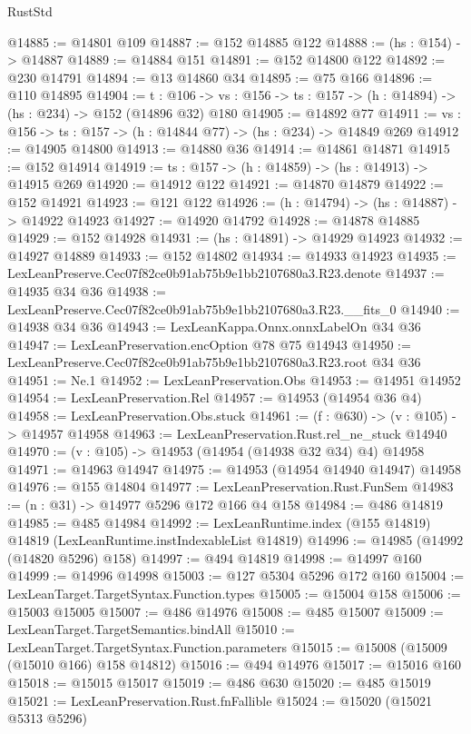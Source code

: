 \begin{lexlean}{RustStd}
\begin{coremodule}
@14885 := @14801 @109
@14887 := @152 @14885 @122
@14888 := (hs : @154) -> @14887
@14889 := @14884 @151
@14891 := @152 @14800 @122
@14892 := @230 @14791
@14894 := @13 @14860 @34
@14895 := @75 @166
@14896 := @110 @14895
@14904 := {t : @106} ->
  {vs : @156} -> {ts : @157} -> (h : @14894) -> (hs : @234) -> @152 (@14896 @32) @180
@14905 := @14892 @77
@14911 := {vs : @156} -> {ts : @157} -> (h : @14844 @77) -> (hs : @234) -> @14849 @269
@14912 := @14905 @14800
@14913 := @14880 @36
@14914 := @14861 @14871
@14915 := @152 @14914
@14919 := {ts : @157} -> (h : @14859) -> (hs : @14913) -> @14915 @269
@14920 := @14912 @122
@14921 := @14870 @14879
@14922 := @152 @14921
@14923 := @121 @122
@14926 := (h : @14794) -> (hs : @14887) -> @14922 @14923
@14927 := @14920 @14792
@14928 := @14878 @14885
@14929 := @152 @14928
@14931 := (hs : @14891) -> @14929 @14923
@14932 := @14927 @14889
@14933 := @152 @14802
@14934 := @14933 @14923
@14935 := LexLeanPreserve.Cec07f82ce0b91ab75b9e1bb2107680a3.R23.denote
@14937 := @14935 @34 @36
@14938 := LexLeanPreserve.Cec07f82ce0b91ab75b9e1bb2107680a3.R23.__fits_0
@14940 := @14938 @34 @36
@14943 := LexLeanKappa.Onnx.onnxLabelOn @34 @36
@14947 := LexLeanPreservation.encOption @78 @75 @14943
@14950 := LexLeanPreserve.Cec07f82ce0b91ab75b9e1bb2107680a3.R23.root @34 @36
@14951 := Ne.{1}
@14952 := LexLeanPreservation.Obs
@14953 := @14951 @14952
@14954 := LexLeanPreservation.Rel
@14957 := @14953 (@14954 @36 @4)
@14958 := LexLeanPreservation.Obs.stuck
@14961 := (f : @630) -> (v : @105) -> @14957 @14958
@14963 := LexLeanPreservation.Rust.rel_ne_stuck @14940
@14970 := (v : @105) -> @14953 (@14954 (@14938 @32 @34) @4) @14958
@14971 := @14963 @14947
@14975 := @14953 (@14954 @14940 @14947) @14958
@14976 := @155 @14804
@14977 := LexLeanPreservation.Rust.FunSem
@14983 := (n : @31) -> @14977 @5296 @172 @166 @4 @158
@14984 := @486 @14819
@14985 := @485 @14984
@14992 := LexLeanRuntime.index (@155 @14819) @14819 (LexLeanRuntime.instIndexableList @14819)
@14996 := @14985 (@14992 (@14820 @5296) @158)
@14997 := @494 @14819
@14998 := @14997 @160
@14999 := @14996 @14998
@15003 := @127 @5304 @5296 @172 @160
@15004 := LexLeanTarget.TargetSyntax.Function.types
@15005 := @15004 @158
@15006 := @15003 @15005
@15007 := @486 @14976
@15008 := @485 @15007
@15009 := LexLeanTarget.TargetSemantics.bindAll
@15010 := LexLeanTarget.TargetSyntax.Function.parameters
@15015 := @15008 (@15009 (@15010 @166) @158 @14812)
@15016 := @494 @14976
@15017 := @15016 @160
@15018 := @15015 @15017
@15019 := @486 @630
@15020 := @485 @15019
@15021 := LexLeanPreservation.Rust.fnFallible
@15024 := @15020 (@15021 @5313 @5296)

\end{coremodule}
\end{lexlean}
